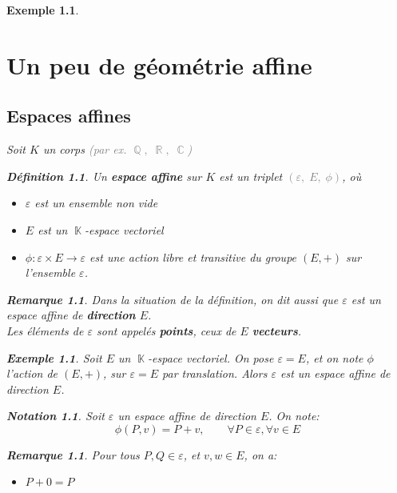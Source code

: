 \documentclass[a4paper, oneside]{report}
\theoremstyle{break}
\newtheorem{definition}[thm]{Définition}
\newtheorem{notation}[thm]{Notation}
\newtheorem{exemple}[thm]{Exemple}
\newtheorem{remarque}[thm]{Remarque}
\newcommand{\gray}[1]{\textcolor{gray}{#1}}
\DeclareMathOperator{\R}{\mathbb{R}}
\DeclareMathOperator{\K}{\mathbb{K}}
\DeclareMathOperator{\C}{\mathbb{C}}
\DeclareMathOperator{\Q}{\mathbb{Q}}
\newcommand{\slign}{\textbf}
\begin{document}
\begin{exemple}
\chapter{Un peu de géométrie affine}

\section{Espaces affines}

Soit $K$ un corps \gray{(par ex. $\Q, \; \R, \; \C$)}

\begin{definition}
Un \slign{espace affine} sur $K$ est un triplet \gray{$(\varepsilon, \; E, \; \phi)$}, où
\begin{itemize}[label=$\bullet$]
\item $\varepsilon$ est un ensemble non vide

\item $E$ est un $\K$-espace vectoriel

\item $\phi : \varepsilon \times E \longrightarrow \varepsilon$ est une action libre et transitive du groupe $(E, +)$ sur l'ensemble $\varepsilon$.
\end{itemize}
\end{definition}

\begin{remarque}
Dans la situation de la définition, on dit aussi que $\varepsilon$ est un espace affine de \slign{direction} $E$.\\
Les éléments de $\varepsilon$ sont appelés \slign{points}, ceux de $E$ \slign{vecteurs}.
\end{remarque}

\begin{exemple}
Soit $E$ un $\K$-espace vectoriel. On pose $\varepsilon = E$, et on note $\phi$ l'action de $(E, +)$, sur $\varepsilon = E$ par translation. Alors $\varepsilon$ est un espace affine de direction $E$.
\end{exemple}

\begin{notation}
Soit $\varepsilon$ un espace affine de direction $E$. On note:
\[
\phi(P, v) = P + v,		\qquad	\forall P \in \varepsilon, \forall v \in E
\]
\end{notation}

\begin{remarque}
Pour tous $P, Q \in \varepsilon$, et $v,w \in E$, on a:
\begin{itemize}[label=$\bullet$]
\item $P + 0 = P$


\end{itemize}
\end{remarque}
\end{exemple}
\end{document}
